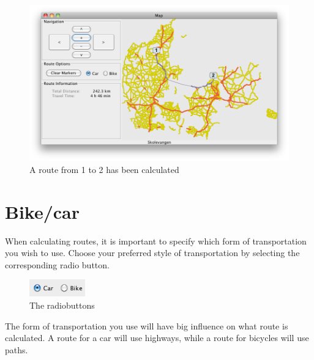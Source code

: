 \begin{figure}[h!]
\centering
\includegraphics[width=1\linewidth]{images/man-route.png}
\caption{A route from 1 to 2 has been calculated}
\label{MAN-RF-IMG}
\end{figure}

\section{Bike/car}
\label{MAN-BC}
When calculating routes, it is important to specify which form of
transportation you wish to use. Choose your preferred style of transportation by
selecting the corresponding radio button.

\begin{figure}[h!]
\centering
\includegraphics[height=2em]{images/radiobuttons.png}
\caption{The radiobuttons}
\label{MAN-BC-IMG}
\end{figure}

The form of transportation you use will have big influence on what route is
calculated. A route for a car will use highways, while a route for bicycles will
use paths.

